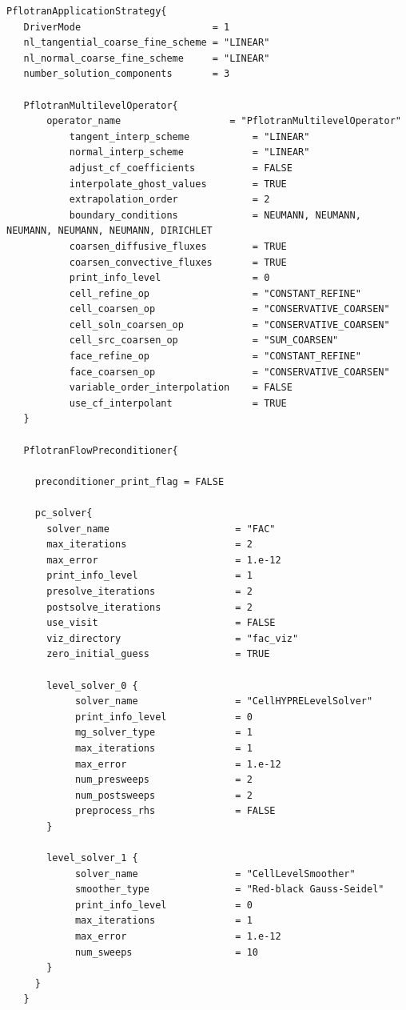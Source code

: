 \documentclass[12pt]{article}
\begin{document}
\begin{verbatim}
PflotranApplicationStrategy{
   DriverMode                       = 1
   nl_tangential_coarse_fine_scheme = "LINEAR"
   nl_normal_coarse_fine_scheme     = "LINEAR"
   number_solution_components       = 3

   PflotranMultilevelOperator{
       operator_name                   = "PflotranMultilevelOperator"
	       tangent_interp_scheme           = "LINEAR"
	       normal_interp_scheme            = "LINEAR"
	       adjust_cf_coefficients          = FALSE
	       interpolate_ghost_values        = TRUE
	       extrapolation_order             = 2
	       boundary_conditions             = NEUMANN, NEUMANN, NEUMANN, NEUMANN, NEUMANN, DIRICHLET
	       coarsen_diffusive_fluxes        = TRUE
	       coarsen_convective_fluxes       = TRUE
	       print_info_level                = 0
	       cell_refine_op                  = "CONSTANT_REFINE"
	       cell_coarsen_op                 = "CONSERVATIVE_COARSEN"
	       cell_soln_coarsen_op            = "CONSERVATIVE_COARSEN"
	       cell_src_coarsen_op             = "SUM_COARSEN"
	       face_refine_op                  = "CONSTANT_REFINE"
	       face_coarsen_op                 = "CONSERVATIVE_COARSEN"
	       variable_order_interpolation    = FALSE
	       use_cf_interpolant              = TRUE
   }

   PflotranFlowPreconditioner{

     preconditioner_print_flag = FALSE

     pc_solver{
       solver_name                      = "FAC"
       max_iterations                   = 2
       max_error                        = 1.e-12
       print_info_level                 = 1 
       presolve_iterations              = 2
       postsolve_iterations             = 2
       use_visit                        = FALSE
       viz_directory                    = "fac_viz"
       zero_initial_guess               = TRUE

       level_solver_0 {
            solver_name                 = "CellHYPRELevelSolver"
            print_info_level            = 0 
            mg_solver_type              = 1
            max_iterations              = 1
            max_error                   = 1.e-12
            num_presweeps               = 2
            num_postsweeps              = 2
            preprocess_rhs              = FALSE
       }

       level_solver_1 {
            solver_name                 = "CellLevelSmoother"
            smoother_type               = "Red-black Gauss-Seidel"
            print_info_level            = 0 
            max_iterations              = 1
            max_error                   = 1.e-12
            num_sweeps                  = 10
       }
     }
   }


\end{verbatim}
\end{document}
